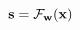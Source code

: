 \vspace{-0.1cm}
\begin{equation}
    \mathbf{s} = \mathcal{F}_\mathbf{w}(\mathbf{x})
    \label{eq:forward-pass}
    \vspace{-0.05cm}
\end{equation}

